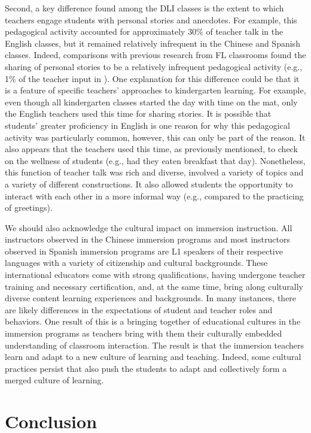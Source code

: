 \documentclass[output=paper,chinesefont]{langscibook}
\begin{document}
Second, a key difference found among the DLI classes is the extent to which teachers engage students with personal stories and anecdotes. For example, this pedagogical activity accounted for approximately 30\% of teacher talk in the English classes, but it remained relatively infrequent in the Chinese and Spanish classes. Indeed, comparisons with previous research from FL classrooms found the sharing of personal stories to be a relatively infrequent pedagogical activity (e.g., 1\% of the teacher input in \citealt{CollinsEtAl2012}). One explanation for this difference could be that it is a feature of specific teachers’ approaches to kindergarten learning. For example, even though all kindergarten classes started the day with time on the mat, only the English teachers used this time for sharing stories. It is possible that students’ greater proficiency in English is one reason for why this pedagogical activity was particularly common, however, this can only be part of the reason. It also appears that the teachers used this time, as previously mentioned, to check on the wellness of students (e.g., had they eaten breakfast that day). Nonetheless, this function of teacher talk was rich and diverse, involved a variety of topics and a variety of different constructions. It also allowed students the opportunity to interact with each other in a more informal way (e.g., compared to the practicing of greetings).\largerpage

We should also acknowledge the cultural impact on immersion instruction. All instructors observed in the Chinese immersion programs and most instructors observed in Spanish immersion programs are L1 speakers of their respective languages with a variety of citizenship and cultural backgrounds. These international educators come with strong qualifications, having undergone teacher training and necessary certification, and, at the same time, bring along culturally diverse content learning experiences and backgrounds. In many instances, there are likely differences in the expectations of student and teacher roles and behaviors. One result of this is a bringing together of educational cultures in the immersion programs as teachers bring with them their culturally embedded understanding of classroom interaction. The result is that the immersion teachers learn and adapt to a new culture of learning and teaching. Indeed, some cultural practices persist that also push the students to adapt and collectively form a merged culture of learning.

\section{Conclusion}
\end{document}
